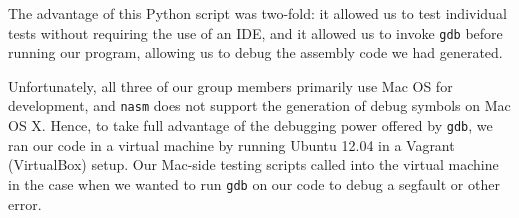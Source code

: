 \documentclass[letterpaper]{article}
\begin{document}
  The advantage of this Python script was two-fold: it allowed us to test
  individual tests without requiring the use of an IDE, and it allowed us to
  invoke {\tt gdb} before running our program, allowing us to debug the
  assembly code we had generated.

  Unfortunately, all three of our group members primarily use Mac OS for
  development, and {\tt nasm} does not support the generation of debug symbols
  on Mac OS X. Hence, to take full advantage of the debugging power offered by
  {\tt gdb}, we ran our code in a virtual machine by running Ubuntu 12.04 in a
  Vagrant (VirtualBox) setup. Our Mac-side testing scripts called into the
  virtual machine in the case when we wanted to run {\tt gdb} on our code to
  debug a segfault or other error.
\end{document}
